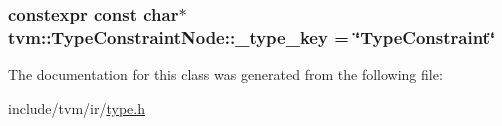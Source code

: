 \subsubsection[{\texorpdfstring{\+\_\+type\+\_\+key}{_type_key}}]{\setlength{\rightskip}{0pt plus 5cm}constexpr const char$\ast$ tvm\+::\+Type\+Constraint\+Node\+::\+\_\+type\+\_\+key = \char`\"{}Type\+Constraint\char`\"{}\hspace{0.3cm}{\ttfamily [static]}}\hypertarget{classtvm_1_1TypeConstraintNode_aed820653ee31d04087f9347c207c1b13}{}\label{classtvm_1_1TypeConstraintNode_aed820653ee31d04087f9347c207c1b13}


The documentation for this class was generated from the following file\+:\begin{DoxyCompactItemize}
\item 
include/tvm/ir/\hyperlink{ir_2type_8h}{type.\+h}\end{DoxyCompactItemize}
